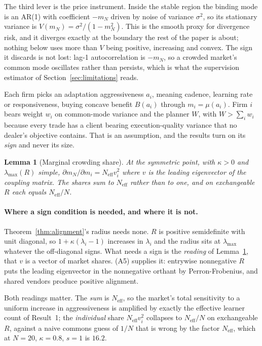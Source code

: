 \documentclass{article}
\theoremstyle{plain}
\newtheorem{lemma}[theorem]{Lemma}
\theoremstyle{definition}
\newcommand{\Neff}{N_{\mathrm{eff}}}
\newcommand{\mN}{m_N}
\newcommand{\lmax}{\lambda_{\max}}
\begin{document}
The third lever is the price instrument. Inside the stable region the binding mode is an AR(1) with coefficient $-\mN$ driven by noise of variance $\sigma^2$, so its stationary variance is $V(\mN) = \sigma^2/(1-\mN^2)$. This is the smooth proxy for divergence risk, and it diverges exactly at the boundary the rest of the paper is about; nothing below uses more than $V$ being positive, increasing and convex. The sign it discards is not lost: lag-1 autocorrelation is $-\mN$, so a crowded market's common mode oscillates rather than persists, which is what the supervision estimator of Section~\ref{sec:limitations} reads.

Each firm picks an adaptation aggressiveness $a_i$, meaning cadence, learning rate or responsiveness, buying concave benefit $B(a_i)$ through $m_i = \mu(a_i)$. Firm $i$ bears weight $w_i$ on common-mode variance and the planner $W$, with $W > \sum_i w_i$ because every trade has a client bearing execution-quality variance that no dealer's objective contains. That is an assumption, and the results turn on its \emph{sign} and never its size.

\begin{lemma}[Marginal crowding share]
\label{lem:share}
At the symmetric point, with $\kappa > 0$ and $\lmax(R)$ simple, $\partial \mN/\partial m_i = \Neff v_i^2$ where $v$ is the leading eigenvector of the coupling matrix. The shares sum to $\Neff$ rather than to one, and on exchangeable $R$ each equals $\Neff/N$.
\end{lemma}

\paragraph{Where a sign condition is needed, and where it is not.}
Theorem~\ref{thm:alignment}'s radius needs none. $R$ is positive semidefinite with unit diagonal, so $1+\kappa(\lambda_i-1)$ increases in $\lambda_i$ and the radius sits at $\lmax$ whatever the off-diagonal signs. What needs a sign is the \emph{reading} of Lemma~\ref{lem:share}, that $v$ is a vector of market shares. (A5) supplies it: entrywise nonnegative $R$ puts the leading eigenvector in the nonnegative orthant by Perron-Frobenius, and shared vendors produce positive alignment.

Both readings matter. The \emph{sum} is $\Neff$, so the market's total sensitivity to a uniform increase in aggressiveness is amplified by exactly the effective learner count of Result~1; the \emph{individual} share $\Neff v_i^2$ collapses to $\Neff/N$ on exchangeable $R$, against a naive commons guess of $1/N$ that is wrong by the factor $\Neff$, which at $N=20$, $\kappa=0.8$, $s=1$ is $16.2$.
\end{document}
